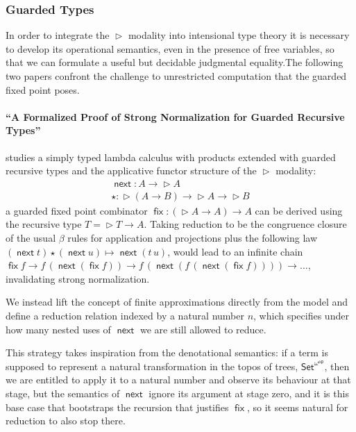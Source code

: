 \documentclass{book}
\DeclareMathOperator{\fix}{\mathsf{fix}}
\newcommand{\red}{\to}
\DeclareMathOperator{\Later}{\vartriangleright}
\DeclareMathOperator{\next}{\ensuremath{\mathsf{next}}}
\begin{document}

\subsubsection{Guarded Types}

In order to integrate the $\Later$ modality into intensional type
theory it is necessary to develop its operational semantics, even in
the presence of free variables, so that we can formulate a useful but
decidable judgmental equality.The following two papers confront the
challenge to unrestricted computation that the guarded fixed point
poses.

  \paragraph{``A Formalized Proof of Strong Normalization for Guarded Recursive Types''}
  studies a simply typed lambda calculus with products extended with guarded
  recursive types and the applicative functor structure of the $\Later$
  modality:
  \[
  \begin{array}{l}
  \next : A \to \Later A \\
  \star : \Later (A \to B) \to \Later A \to \Later B
  \end{array}
  \]
  a guarded fixed point combinator $\fix : (\Later A \to A) \to
  A$ can be derived using the recursive type $T = \Later T \to A$.
  Taking reduction to be the congruence closure of the usual $\beta$ rules
  for application and projections plus the following law $(\next t)
  \star (\next u) \mapsto \next (t\,u)$, would lead to an infinite
  chain $\fix f \red f\,(\next (\fix f)) \red f\,(\next (f\,(\next (\fix f)))) \red
  \ldots$, invalidating strong normalization.

  We instead lift the concept of finite approximations directly from
  the model and define a reduction relation indexed by a natural
  number $n$, which specifies under how many nested uses of $\next$ we
  are still allowed to reduce.

  This strategy takes inspiration from the denotational semantics: if
  a term is supposed to represent a natural transformation in the
  topos of trees, $\mathsf{Set}^{\omega^\mathsf{op}}$, then we are
  entitled to apply it to a natural number and observe its behaviour
  at that stage, but the semantics of $\next$ ignore its argument at
  stage zero, and it is this base case that bootstraps the recursion
  that justifies $\fix$, so it seems natural for reduction to also
  stop there.
\end{document}
